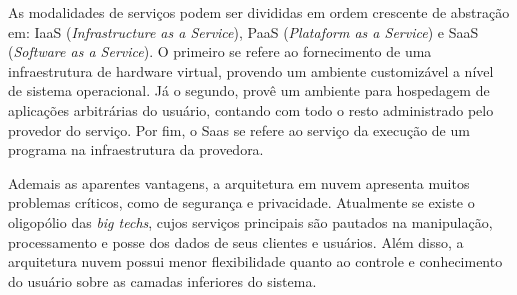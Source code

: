 \documentclass{article}
\begin{document}
As modalidades de serviços podem ser divididas em ordem crescente de abstração
em: IaaS (\textit{Infrastructure as a Service}), PaaS (\textit{Plataform as a
Service}) e SaaS (\textit{Software as a Service}). O primeiro se refere ao
fornecimento de uma infraestrutura de hardware virtual, provendo um ambiente
customizável a nível de sistema operacional. Já o segundo, provê um ambiente
para hospedagem de aplicações arbitrárias do usuário, contando com todo o resto
administrado pelo provedor do serviço. Por fim, o Saas se refere ao serviço da
execução de um programa na infraestrutura da provedora.

Ademais as aparentes vantagens, a arquitetura em nuvem apresenta muitos
problemas críticos, como de segurança e privacidade. Atualmente se existe o
oligopólio das \textit{big techs}, cujos serviços principais são pautados na
manipulação, processamento e posse dos dados de seus clientes e usuários. Além
disso, a arquitetura nuvem possui menor flexibilidade quanto ao controle e
conhecimento do usuário sobre as camadas inferiores do sistema.

\nocite{stallings}



\end{document}
